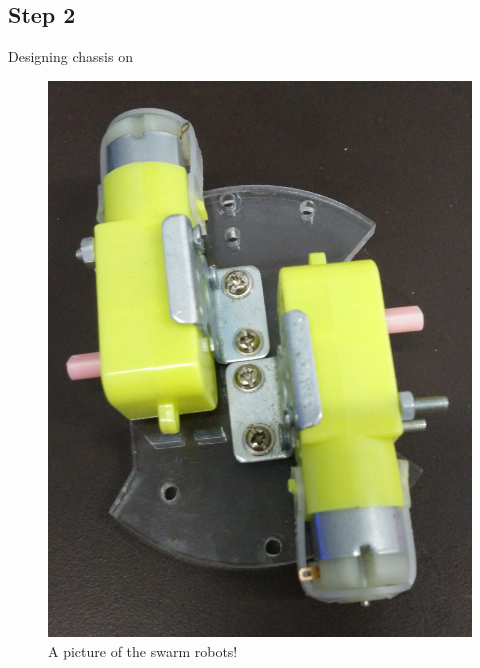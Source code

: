 \documentclass[a4paper,12pt,oneside]{book}
\begin{document}
\subsection*{Step 2}
Designing chassis on 
\hfill\\
\begin{figure}[h!]
	\caption{A picture of the swarm robots!}
	\includegraphics[width=\textwidth]{./Pictures/Chassis_Design}		
\end{figure}	
\hfill\\
\end{document}
